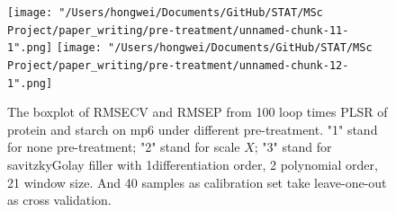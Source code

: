\documentclass[a4paper,12pt,titlepage]{article} %
\numberwithin{equation}{section}  %
\begin{document}
\begin{appendices}
\begin{figure}[h]    %
	\centering           %
	\texttt{[image: "/Users/hongwei/Documents/GitHub/STAT/MSc Project/paper\_writing/pre-treatment/unnamed-chunk-11-1".png]}  %
	\texttt{[image: "/Users/hongwei/Documents/GitHub/STAT/MSc Project/paper\_writing/pre-treatment/unnamed-chunk-12-1".png]}  %
	\caption{The boxplot of RMSECV and RMSEP from 100 loop times PLSR of protein and starch on mp6 under different pre-treatment. "1" stand for none pre-treatment; "2" stand for scale $X$; "3" stand for savitzkyGolay filler with 1differentiation order, 2 polynomial order, 21 window size. And 40 samples as calibration set take leave-one-out as cross validation.}          %
	\label{fig:pre-treatment-11-1}               %
\end{figure}                        %


	\end{appendices}
\end{document}
